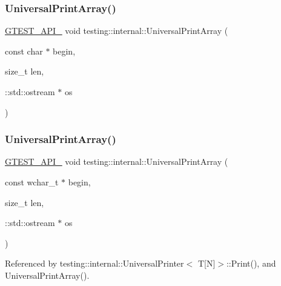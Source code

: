 \subsubsection{\texorpdfstring{Universal\+Print\+Array()}{UniversalPrintArray()}\hspace{0.1cm}{\footnotesize\ttfamily [4/5]}}
{\footnotesize\ttfamily \hyperlink{gtest-port_8h_aa73be6f0ba4a7456180a94904ce17790}{G\+T\+E\+S\+T\+\_\+\+A\+P\+I\+\_\+} void testing\+::internal\+::\+Universal\+Print\+Array (\begin{DoxyParamCaption}\item[{const char $\ast$}]{begin,  }\item[{size\+\_\+t}]{len,  }\item[{\+::std\+::ostream $\ast$}]{os }\end{DoxyParamCaption})}

\mbox{\label{namespacetesting_1_1internal_ae31e146c35fd75afc6a9cc73ae2692d1}} 
\subsubsection{\texorpdfstring{Universal\+Print\+Array()}{UniversalPrintArray()}\hspace{0.1cm}{\footnotesize\ttfamily [5/5]}}
{\footnotesize\ttfamily \hyperlink{gtest-port_8h_aa73be6f0ba4a7456180a94904ce17790}{G\+T\+E\+S\+T\+\_\+\+A\+P\+I\+\_\+} void testing\+::internal\+::\+Universal\+Print\+Array (\begin{DoxyParamCaption}\item[{const wchar\+\_\+t $\ast$}]{begin,  }\item[{size\+\_\+t}]{len,  }\item[{\+::std\+::ostream $\ast$}]{os }\end{DoxyParamCaption})}



Referenced by testing\+::internal\+::\+Universal\+Printer$<$ T\mbox{[}\+N\mbox{]}$>$\+::\+Print(), and Universal\+Print\+Array().

